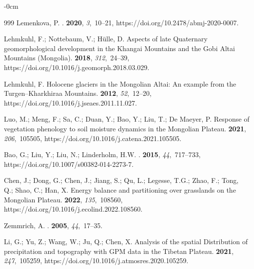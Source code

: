 \documentclass[geosciences,article,accept,pdftex,oneauthor]{Definitions/mdpi}
\begin{document}
\begin{adjustwidth}{-\extralength}{0cm}
\begin{thebibliography}{999}
Lemenkova, P.
.
 {\bf 2020}, {\em 3},~10--21, https://doi.org/10.2478/abmj-2020-0007.

Lehmkuhl, F.; Nottebaum, V.; Hülle, D.
\newblock Aspects of late Quaternary geomorphological development in the
  Khangai Mountains and the Gobi Altai Mountains (Mongolia).
 {\bf 2018}, {\em 312},~24--39, https://doi.org/10.1016/j.geomorph.2018.03.029.

Lehmkuhl, F.
\newblock Holocene glaciers in the Mongolian Altai: An example from the
  Turgen–Kharkhiraa Mountains.
 {\bf 2012}, {\em 52},~12--20, https://doi.org/10.1016/j.jseaes.2011.11.027.

Luo, M.; Meng, F.; Sa, C.; Duan, Y.; Bao, Y.; Liu, T.; {De Maeyer}, P.
\newblock Response of vegetation phenology to soil moisture dynamics in the
  Mongolian Plateau.
 {\bf 2021}, {\em 206},~105505, https://doi.org/10.1016/j.catena.2021.105505.

Bao, G.; Liu, Y.; Liu, N.; Linderholm, H.W.
.
 {\bf 2015}, {\em 44},~717--733, https://doi.org/10.1007/s00382-014-2273-7.

Chen, J.; Dong, G.; Chen, J.; Jiang, S.; Qu, L.; Legesse, T.G.; Zhao, F.; Tong,
  Q.; Shao, C.; Han, X.
\newblock Energy balance and partitioning over grasslands on the Mongolian
  Plateau.
 {\bf 2022}, {\em 135},~108560, https://doi.org/10.1016/j.ecolind.2022.108560.

Zemmrich, A.
.
 {\bf
  2005}, {\em 44},~17--35.

Li, G.; Yu, Z.; Wang, W.; Ju, Q.; Chen, X.
\newblock Analysis of the spatial Distribution of precipitation and topography
  with GPM data in the Tibetan Plateau.
 {\bf 2021}, {\em 247},~105259, https://doi.org/10.1016/j.atmosres.2020.105259.


\end{thebibliography}
\end{adjustwidth}
\end{document}
